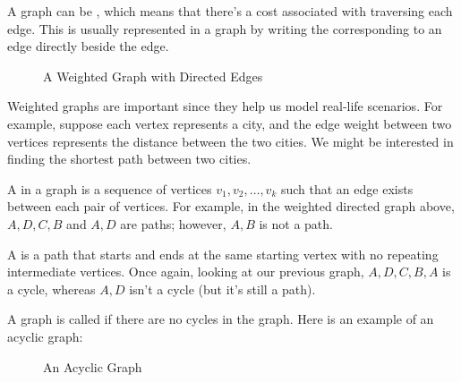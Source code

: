 A graph can be , which means that there's a cost associated with traversing each edge. This is usually represented in a graph by writing the  corresponding to an edge directly beside the edge.

\begin{figure}[h]
\centering
{}
\caption{A Weighted Graph with Directed Edges}
\end{figure}

Weighted graphs are important since they help us model real-life scenarios. For example, suppose each vertex represents a city, and the edge weight between two vertices represents the distance between the two cities. We might be interested in finding the shortest path between two cities. 


A  in a graph is a sequence of vertices $v_1, v_2, \ldots, v_k$ such that an edge exists between each pair of vertices. For example, in the weighted directed graph above, $A, D, C, B$ and $A, D$ are paths; however, $A, B$ is not a path.

A  is a path that starts and ends at the same starting vertex with no repeating intermediate vertices.  Once again, looking at our previous graph, $A, D, C, B, A$ is a cycle, whereas $A, D$ isn't a cycle (but it's still a path). 

A graph is called  if there are no cycles in the graph. Here is an example of an acyclic graph:

\begin{figure}[h]
\centering
{}
\caption{An Acyclic Graph}
\end{figure}

